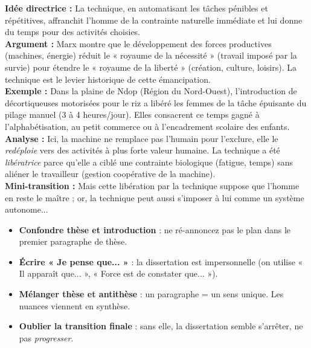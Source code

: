 \documentclass[11pt]{article}
\begin{document}
\begin{corrige}[Exercice 1]
\textbf{Idée directrice :} La technique, en automatisant les tâches pénibles et répétitives, affranchit l'homme de la contrainte naturelle immédiate et lui donne du temps pour des activités choisies. \\
\textbf{Argument :} Marx montre que le développement des forces productives (machines, énergie) réduit le « royaume de la nécessité » (travail imposé par la survie) pour étendre le « royaume de la liberté » (création, culture, loisirs). La technique est le levier historique de cette émancipation. \\
\textbf{Exemple :} Dans la plaine de Ndop (Région du Nord-Ouest), l'introduction de décortiqueuses motorisées pour le riz a libéré les femmes de la tâche épuisante du pilage manuel (3 à 4 heures/jour). Elles consacrent ce temps gagné à l'alphabétisation, au petit commerce ou à l'encadrement scolaire des enfants. \\
\textbf{Analyse :} Ici, la machine ne remplace pas l'humain pour l'exclure, elle le \emph{redéploie} vers des activités à plus forte valeur humaine. La technique a été \emph{libératrice} parce qu'elle a ciblé une contrainte biologique (fatigue, temps) sans aliéner le travailleur (gestion coopérative de la machine). \\
\textbf{Mini-transition :} Mais cette libération par la technique suppose que l'homme en reste le maître ; or, la technique peut aussi s'imposer à lui comme un système autonome...
\end{corrige}

\begin{attention}
\begin{itemize}
    \item \textbf{Confondre thèse et introduction} : ne ré-annoncez pas le plan dans le premier paragraphe de thèse.
    \item \textbf{Écrire « Je pense que... »} : la dissertation est impersonnelle (on utilise « Il apparaît que... », « Force est de constater que... »).
    \item \textbf{Mélanger thèse et antithèse} : un paragraphe = un sens unique. Les nuances viennent en synthèse.
    \item \textbf{Oublier la transition finale} : sans elle, la dissertation semble s'arrêter, ne pas \emph{progresser}.
\end{itemize}
\end{attention}
\end{document}
